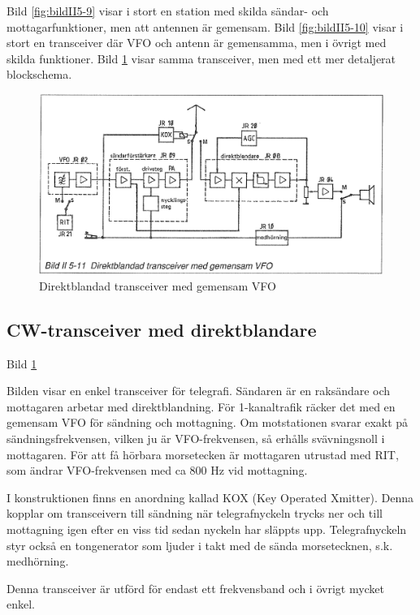 Bild \ref{fig:bildII5-9} visar i stort en station med skilda sändar- och
mottagarfunktioner, men att antennen är gemensam.  Bild \ref{fig:bildII5-10} visar
i stort en transceiver där VFO och antenn är gemensamma, men i övrigt
med skilda funktioner.  Bild \ref{fig:bildII5-11} visar samma transceiver, men med
ett mer detaljerat blockschema.

\begin{figure}
  \includegraphics[width=\textwidth]{images/bild_2_5-11}
  \caption{Direktblandad transceiver med gemensam VFO}
  \label{fig:bildII5-11}
\end{figure}

\subsection{CW-transceiver med direktblandare}

Bild \ref{fig:bildII5-11}

Bilden visar en enkel transceiver för telegrafi. Sändaren är en
raksändare och mottagaren arbetar med direktblandning. För
1-kanaltrafik räcker det med en gemensam VFO för sändning och
mottagning. Om motstationen svarar exakt på sändningsfrekvensen,
vilken ju är VFO-frekvensen, så erhålls svävningsnoll i
mottagaren. För att få hörbara morsetecken är mottagaren utrustad med
RIT, som ändrar VFO-frekvensen med ca 800 Hz vid mottagning.

I konstruktionen finns en anordning kallad KOX (Key Operated
Xmitter). Denna kopplar om transceivern till sändning när
telegrafnyckeln trycks ner och till mottagning igen efter en viss tid
sedan nyckeln har släppts upp. Telegrafnyckeln styr också en
tongenerator som ljuder i takt med de sända morsetecknen,
s.k. medhörning.

Denna transceiver är utförd för endast ett frekvensband och i övrigt
mycket enkel.

